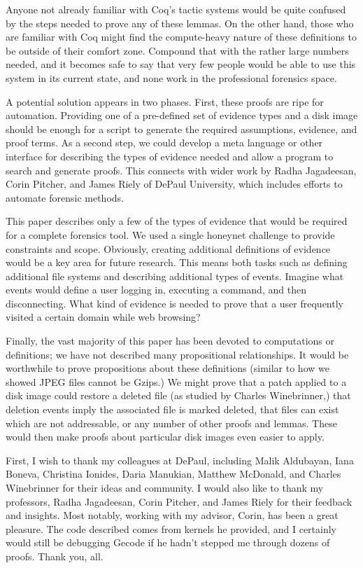 \documentclass[nocopyrightspace]{sigplanconf}
\begin{document}
Anyone not already familiar with Coq's tactic systems would be quite confused
by the steps needed to prove any of these lemmas. On the other hand, those who
are familiar with Coq might find the compute-heavy nature of these definitions
to be outside of their comfort zone. Compound that with the rather large
numbers needed, and it becomes safe to say that very few people would be able
to use this system in its current state, and none work in the professional
forensics space.

A potential solution appears in two phases. First, these proofs are ripe for
automation. Providing one of a pre-defined set of evidence types and a disk
image should be enough for a script to generate the required assumptions,
evidence, and proof terms. As a second step, we could develop a meta language
or other interface for describing the types of evidence needed and allow a
program to search and generate proofs. This connects with wider work by Radha
Jagadeesan, Corin Pitcher, and James Riely of DePaul University, which
includes efforts to automate forensic methods.

This paper describes only a few of the types of evidence that would be
required for a complete forensics tool. We used a single honeynet challenge to
provide constraints and scope. Obviously, creating additional definitions of
evidence would be a key area for future research. This means both tasks such
as defining additional file systems and describing additional types of events.
Imagine what events would define a user logging in, executing a command, and
then disconnecting. What kind of evidence is needed to prove that a user
frequently visited a certain domain while web browsing?

Finally, the vast majority of this paper has been devoted to computations or
definitions; we have not described many propositional relationships. It would
be worthwhile to prove propositions about these definitions (similar to how we
showed JPEG files cannot be Gzips.) We might prove that a patch applied to a
disk image could restore a deleted file (as studied by Charles Winebrinner,)
that deletion events imply the associated file is marked deleted, that files
can exist which are not addressable, or any number of other proofs and lemmas.
These would then make proofs about particular disk images even easier to
apply.

\acks
First, I wish to thank my colleagues at DePaul, including Malik Aldubayan,
Iana Boneva, Christina Ionides, Daria Manukian, Matthew McDonald, and Charles
Winebrinner for their ideas and community. I would also like to thank my
professors, Radha Jagadeesan, Corin Pitcher, and James Riely for their
feedback and insights. Most notably, working with my advisor, Corin, has been
a great pleasure. The code described comes from kernels he provided, and I
certainly would still be debugging Gecode if he hadn't stepped me through
dozens of proofs. Thank you, all.
\end{document}
